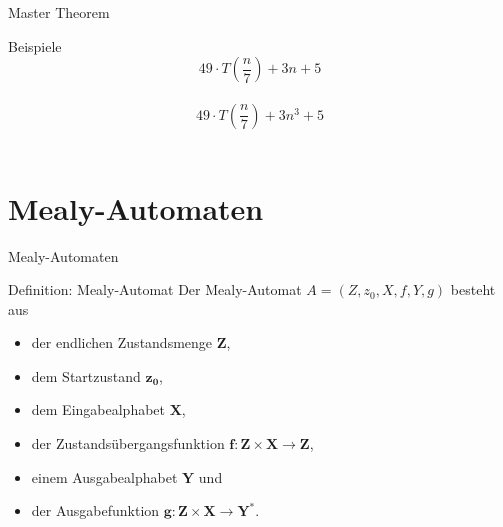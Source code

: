	\begin{frame}{Master Theorem}
		\begin{exampleblock}{Beispiele}
			\[49 \cdot T( \frac{n}{7} ) + 3n + 5\]\\
			\[49 \cdot T( \frac{n}{7} ) + 3n^3 + 5\]\\
		\end{exampleblock}
	\end{frame}
	
	
	
	\section{Mealy-Automaten}
	\begin{frame}{Mealy-Automaten}
		\begin{block}{Definition: Mealy-Automat}
        Der Mealy-Automat $A = \left( Z, z_0, X, f, Y, g \right)$ besteht aus
        	\begin{itemize}
            	\item der endlichen Zustandsmenge $\mathbf{Z}$,
				\pause
            	\item dem Startzustand $\mathbf{z_0}$,
				\pause
            	\item dem Eingabealphabet $\mathbf{X}$,
				\pause
            	\item der Zustandsübergangsfunktion $\mathbf{f: Z\times X \rightarrow Z}$,
				\pause
            	\item einem Ausgabealphabet $\mathbf{Y}$ und
				\pause
            	\item der Ausgabefunktion $\mathbf{g: Z\times X \rightarrow Y^*}$.
        	\end{itemize}
    	\end{block}
	\end{frame}
	
